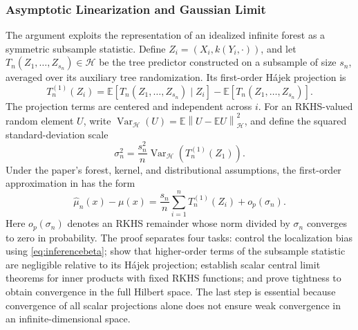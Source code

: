 \documentclass[12pt,a4paper]{article}
\newcommand{\E}{\mathbb E}
\newcommand{\calH}{\mathcal H}
\newcommand{\Var}{\operatorname{Var}}
\newcommand{\1}{\mathbf 1}
\newcommand{\norm}[1]{\left\lVert#1\right\rVert}
\begin{document}
\subsubsection{Asymptotic Linearization and Gaussian Limit}
The argument exploits the representation of an idealized infinite forest as a symmetric subsample statistic. Define $Z_i=(X_i,k(Y_i,\cdot))$, and let $T_n(Z_1,\ldots,Z_{s_n})\in\calH$ be the tree predictor constructed on a subsample of size $s_n$, averaged over its auxiliary tree randomization. Its first-order H\'ajek projection is
\[
 T_n^{(1)}(Z_i)=\E[T_n(Z_1,\ldots,Z_{s_n})\mid Z_i]
           -\E[T_n(Z_1,\ldots,Z_{s_n})].
\]
The projection terms are centered and independent across $i$. For an RKHS-valued random element $U$, write $\Var_{\calH}(U)=\E\norm{U-\E U}_{\calH}^2$, and define the squared standard-deviation scale
\begin{equation}\label{eq:sigmadef}
 \sigma_n^2=\frac{s_n^2}{n}\Var_{\calH}(T_n^{(1)}(Z_1)).
\end{equation}
Under the paper's forest, kernel, and distributional assumptions, the first-order approximation in \cite[Theorem~3]{naf2023} has the form
\begin{equation}\label{eq:hajek}
 \widehat\mu_n(x)-\mu(x)
 =\frac{s_n}{n}\sum_{i=1}^n T_n^{(1)}(Z_i)+o_p(\sigma_n).
\end{equation}
Here $o_p(\sigma_n)$ denotes an RKHS remainder whose norm divided by $\sigma_n$ converges to zero in probability. The proof separates four tasks: control the localization bias using \eqref{eq:inferencebeta}; show that higher-order terms of the subsample statistic are negligible relative to its H\'ajek projection; establish scalar central limit theorems for inner products with fixed RKHS functions; and prove tightness to obtain convergence in the full Hilbert space. The last step is essential because convergence of all scalar projections alone does not ensure weak convergence in an infinite-dimensional space.
\end{document}

